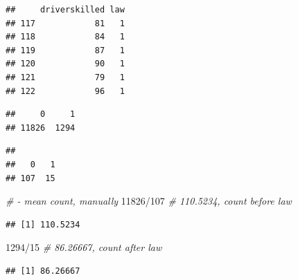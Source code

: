\documentclass[
]{book}
\makeatletter
\newenvironment{Shaded}{\begin{snugshade}}{\end{snugshade}}
\newcommand{\CommentTok}[1]{\textcolor[rgb]{0.37,0.37,0.37}{\textit{#1}}}
\newcommand{\DecValTok}[1]{\textcolor[rgb]{0.06,0.06,0.06}{#1}}
\newcommand{\FunctionTok}[1]{\textcolor[rgb]{0,0,0}{#1}}
\newcommand{\NormalTok}[1]{#1}
\newcommand{\SpecialCharTok}[1]{\textcolor[rgb]{0,0,0}{#1}}
\newenvironment{kframe}{%
\medskip{}
\setlength{\fboxsep}{.8em}
 \def\at@end@of@kframe{}%
 \ifinner\ifhmode%
  \def\at@end@of@kframe{\end{minipage}}%
  \begin{minipage}{\columnwidth}%
 \fi\fi%
 \def\FrameCommand##1{\hskip\@totalleftmargin \hskip-\fboxsep
 \colorbox{shadecolor}{##1}\hskip-\fboxsep
     \hskip-\linewidth \hskip-\@totalleftmargin \hskip\columnwidth}%
 \MakeFramed {\advance\hsize-\width
   \@totalleftmargin\z@ \linewidth\hsize
   \@setminipage}}%
 {\par\unskip\endMakeFramed%
 \at@end@of@kframe}
\renewenvironment{Shaded}{\begin{kframe}}{\end{kframe}}
\makeatother
\begin{document}
\begin{verbatim}
##     driverskilled law
## 117            81   1
## 118            84   1
## 119            87   1
## 120            90   1
## 121            79   1
## 122            96   1
\end{verbatim}

\begin{Shaded}
\end{Shaded}

\begin{verbatim}
##     0     1 
## 11826  1294
\end{verbatim}

\begin{Shaded}
\end{Shaded}

\begin{verbatim}
## 
##   0   1 
## 107  15
\end{verbatim}

\begin{Shaded}
\begin{Highlighting}[]
\CommentTok{\# {-} mean count, manually}
\DecValTok{11826}\SpecialCharTok{/}\DecValTok{107}  \CommentTok{\# 110.5234, count before law}
\end{Highlighting}
\end{Shaded}

\begin{verbatim}
## [1] 110.5234
\end{verbatim}

\begin{Shaded}
\begin{Highlighting}[]
\DecValTok{1294}\SpecialCharTok{/}\DecValTok{15}  \CommentTok{\# 86.26667, count after law}
\end{Highlighting}
\end{Shaded}

\begin{verbatim}
## [1] 86.26667
\end{verbatim}
\end{document}
